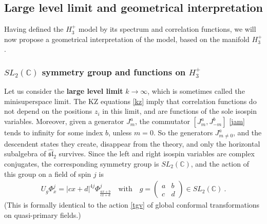 \documentclass[12pt, a4paper, notitlepage, twoside]{report}
\numberwithin{equation}{section}
\theoremstyle{break}
\begin{document}
\subsection{Large level limit and geometrical interpretation}

Having defined the $H_3^+$ model by its spectrum and correlation functions, we will now propose a geometrical interpretation of the model, based on the manifold $H_3^+$.

\subsubsection{$SL_2({\mathbb{C}})$ symmetry group and functions on $H_3^+$}

Let us consider the \textbf{\boldmath large level limit} $k\to \infty$, which is sometimes called the minisuperspace limit. 
The KZ equations \eqref{kz} imply that correlation functions do not depend on the positions $z_i$ in this limit, and are functions of the sole isospin variables. 
Moreover, given a generator $J^a_m$, the commutator $[J^a_m,J^b_{-m}]$ \eqref{jam}  tends to infinity for some index $b$, unless $m=0$. 
So the generators $J^a_{m\neq 0}$, and the descendent states they create, disappear from the theory, and only the horizontal subalgebra of $\widehat{\mathfrak{sl}}_2$ survives.
Since the left and right isospin variables are complex conjugates, the corresponding symmetry group is $SL_2({\mathbb{C}})$, and the action of this group on a field of spin $j$ is 
\begin{align}
 U_g\Phi^j_{x} = |cx+d|^{4j}\Phi^j_{\frac{ax+b}{cx+d}} \quad \text{with} \quad g = \left(\begin{array}{cc} a & b \\ c & d \end{array}\right) \in SL_2({\mathbb{C}})\ .
\label{ugp}
\end{align}
(This is formally identical to the action \eqref{tgv} of global conformal transformations on quasi-primary fields.)
\end{document}
